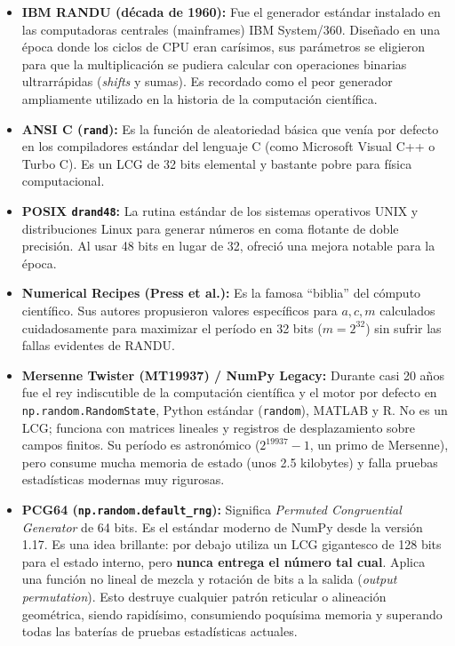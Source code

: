 \documentclass[12pt]{article}
\begin{document}
\begin{itemize}
    \item \textbf{IBM RANDU (década de 1960):} Fue el generador estándar instalado en las computadoras centrales (mainframes) IBM System/360. Diseñado en una época donde los ciclos de CPU eran carísimos, sus parámetros se eligieron para que la multiplicación se pudiera calcular con operaciones binarias ultrarrápidas (\textit{shifts} y sumas). Es recordado como el peor generador ampliamente utilizado en la historia de la computación científica.
    
    \item \textbf{ANSI C (\texttt{rand}):} Es la función de aleatoriedad básica que venía por defecto en los compiladores estándar del lenguaje C (como Microsoft Visual C++ o Turbo C). Es un LCG de 32 bits elemental y bastante pobre para física computacional.
    
    \item \textbf{POSIX \texttt{drand48}:} La rutina estándar de los sistemas operativos UNIX y distribuciones Linux para generar números en coma flotante de doble precisión. Al usar 48 bits en lugar de 32, ofreció una mejora notable para la época.
    
    \item \textbf{Numerical Recipes (Press et al.):} Es la famosa ``biblia'' del cómputo científico. Sus autores propusieron valores específicos para $a, c, m$ calculados cuidadosamente para maximizar el período en 32 bits ($m = 2^{32}$) sin sufrir las fallas evidentes de RANDU.
    
    \item \textbf{Mersenne Twister (MT19937) / NumPy Legacy:} Durante casi 20 años fue el rey indiscutible de la computación científica y el motor por defecto en \texttt{np.random.RandomState}, Python estándar (\texttt{random}), MATLAB y R. No es un LCG; funciona con matrices lineales y registros de desplazamiento sobre campos finitos. Su período es astronómico ($2^{19937} - 1$, un primo de Mersenne), pero consume mucha memoria de estado (unos 2.5 kilobytes) y falla pruebas estadísticas modernas muy rigurosas.
    
    \item \textbf{PCG64 (\texttt{np.random.default\_rng}):} Significa \textit{Permuted Congruential Generator} de 64 bits. Es el estándar moderno de NumPy desde la versión 1.17. Es una idea brillante: por debajo utiliza un LCG gigantesco de 128 bits para el estado interno, pero \textbf{nunca entrega el número tal cual}. Aplica una función no lineal de mezcla y rotación de bits a la salida (\textit{output permutation}). Esto destruye cualquier patrón reticular o alineación geométrica, siendo rapidísimo, consumiendo poquísima memoria y superando todas las baterías de pruebas estadísticas actuales.
\end{itemize}
\end{document}
